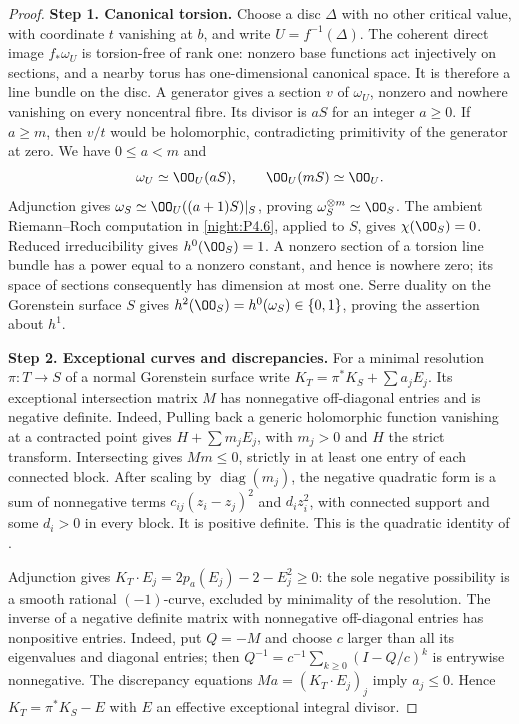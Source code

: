 \begin{proof}
\noindent\textbf{Step 1. Canonical torsion.}
Choose a disc $\Delta$ with no other critical value, with coordinate
$t$ vanishing at $b$, and write $U=f^{-1}(\Delta)$. The coherent
direct image $f_*\omega_U$ is torsion-free of rank one: nonzero
base functions act injectively on sections, and a nearby torus has
one-dimensional canonical space. It is therefore a line bundle
on the disc. A generator gives a section $v$ of $\omega_U$,
nonzero and nowhere vanishing on every noncentral fibre. Its
divisor is $aS$ for an integer $a\ge0$. If $a\ge m$, then $v/t$
would be holomorphic, contradicting primitivity of the generator
at zero. We have $0\le a<m$ and
\[
 \omega_U\simeq\OO_U(aS),\qquad\OO_U(mS)\simeq\OO_U.
\]
Adjunction gives $\omega_S\simeq\OO_U((a+1)S)|_S$, proving
$\omega_S^{\otimes m}\simeq\OO_S$. The ambient
Riemann--Roch computation in \ref{night:P4.6}, applied to $S$, gives
$\chi(\OO_S)=0$. Reduced irreducibility gives $h^0(\OO_S)=1$.
A nonzero section of a torsion line bundle has a power equal to
a nonzero constant, and hence is nowhere zero; its space of
sections consequently has dimension at most one. Serre duality
on the Gorenstein surface $S$ gives
$h^2(\OO_S)=h^0(\omega_S)\in\{0,1\}$, proving the assertion
about $h^1$.

\noindent\textbf{Step 2. Exceptional curves and discrepancies.}
For a minimal resolution $\pi:T\to S$ of a normal Gorenstein
surface write $K_T=\pi^*K_S+\sum a_jE_j$. Its exceptional
intersection matrix $M$ has nonnegative off-diagonal entries
and is negative definite. Indeed,
Pulling back a generic holomorphic function vanishing at a
contracted point gives $H+\sum m_jE_j$, with $m_j>0$ and $H$
the strict transform. Intersecting gives $Mm\le0$, strictly in
at least one entry of each connected block. After scaling by
$\operatorname{diag}(m_j)$, the negative quadratic form is a
sum of nonnegative terms $c_{ij}(z_i-z_j)^2$ and $d_i z_i^2$,
with connected support and some $d_i>0$ in every block. It is
positive definite. This is the quadratic identity of
\cite[\S I, unnumbered assertion and proof, p.~6]{Mumford1961}.

Adjunction gives
$K_T\cdot E_j=2p_a(E_j)-2-E_j^2\ge0$: the sole negative
possibility is a smooth rational $(-1)$-curve, excluded by
minimality of the resolution. The inverse of a negative definite
matrix with nonnegative off-diagonal entries has nonpositive
entries. Indeed, put $Q=-M$ and choose $c$ larger than all its
eigenvalues and diagonal entries; then
$Q^{-1}=c^{-1}\sum_{k\ge0}(I-Q/c)^k$ is entrywise nonnegative.
The discrepancy equations $Ma=(K_T\cdot E_j)_j$ imply
$a_j\le0$. Hence $K_T=\pi^*K_S-E$ with $E$ an effective
exceptional integral divisor.


\end{proof}

